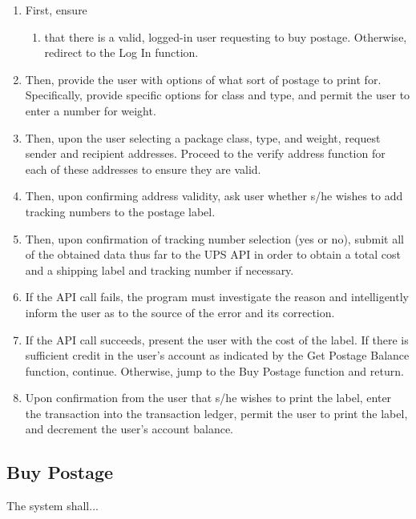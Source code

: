\documentclass{scrreprt}
\begin{document}
\begin{enumerate}
\item First, ensure
\begin{enumerate}
\item that there is a valid, logged-in user requesting to buy postage.
Otherwise, redirect to the Log In function.
\end{enumerate}
\item Then, provide the user with options of what sort of postage to print 
for. Specifically, provide specific options for class and type, and permit 
the user to enter a number for weight.
\item Then, upon the user selecting a package class, type, and weight, 
request sender and recipient addresses. Proceed to the verify address function 
for each of these addresses to ensure they are valid.
\item Then, upon confirming address validity, ask user whether s/he wishes to 
add tracking numbers to the postage label.
\item Then, upon confirmation of tracking number selection (yes or no), submit 
all of the obtained data thus far to the UPS API in order to obtain a total 
cost and a shipping label and tracking number if necessary.
\item If the API call fails, the program must investigate the reason and 
intelligently inform the user as to the source of the error and its correction.
\item If the API call succeeds, present the user with the cost of the 
label. If there is sufficient credit in the user's account as indicated by the
Get Postage Balance function, continue.  Otherwise, jump to the Buy Postage
function and return.
\item Upon confirmation from the user that s/he wishes to print the label,
enter the transaction into the transaction ledger, permit the user to print the
label, and decrement the user's account balance.
\end{enumerate}

\subsection{Buy Postage}

The system shall...
\end{document}
